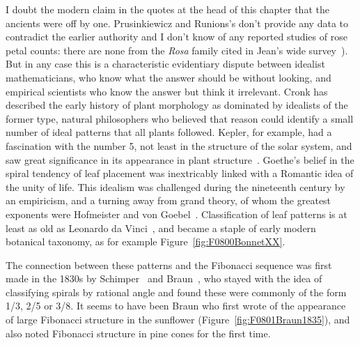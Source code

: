   I doubt the modern claim in the quotes at the head of this chapter that the ancients were off by one.  Prusinkiewicz and Runions's don't provide any data to contradict the earlier authority and I don't know of any reported studies of rose petal counts: there are none from the \emph{Rosa} family cited in Jean's wide survey~\cite{jeanPhyllotaxisSystemicStudy1994}). But in any case this is a  characteristic evidentiary dispute between idealist mathematicians, who know what the answer should be without looking, and empirical scientists who know the answer but think it irrelevant.
  Cronk has described the early history of plant morphology as dominated by idealists of the former type, natural philosophers who believed that reason could identify a small number of ideal patterns that all plants followed. Kepler, for example, had a fascination with the number 5, not least in the structure of the solar system,  and saw great significance in its appearance in plant structure~\cite{keplerSixCorneredSnowflake16112014}. Goethe's belief in the spiral tendency of leaf placement was inextricably linked with a Romantic idea of the unity of life. This idealism was challenged during the nineteenth century by an empiricism, and a turning away from grand theory,  of whom the greatest exponents were Hofmeister and von Goebel~\autocite{cronkMolecularOrganographyPlants2009}.
  Classification of leaf patterns is at least as old as Leonardo da Vinci~\cite{douadyPlantsKnowMath2024}, and became a staple of early modern botanical taxonomy, as for example Figure~\ref{fig:F0800BonnetXX}.
  
  The connection between these patterns and the Fibonacci sequence was first made in the 1830s by Schimper~\cite{schimperBeschreibungSymphytumZeyheri1835} and Braun~\cites{braunDrCarlSchimper1835, braunVergleichendeUntersuchungUber1831}, who stayed with the idea of classifying spirals by rational angle and found these were commonly of the form 1/3, 2/5 or 3/8. It seems to have been Braun who first wrote of the appearance of large Fibonacci structure in the sunflower (Figure~\ref{fig:F0801Braun1835}), and also noted Fibonacci structure in pine cones for the first time. 
  

